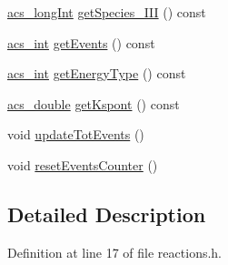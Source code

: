 \begin{DoxyCompactItemize}
\item 
\hyperlink{a00050_a19319d75f02db4308bc5c0026d98cd85}{acs\-\_\-long\-Int} \hyperlink{a00021_aaf426633019113ac4ae54cd5597920be}{get\-Species\-\_\-\-I\-I\-I} () const 
\item 
\hyperlink{a00050_a8d277355641a098190360234e2ebde35}{acs\-\_\-int} \hyperlink{a00021_a4fd82a3f1a6474e53709c2a8c04b793c}{get\-Events} () const 
\item 
\hyperlink{a00050_a8d277355641a098190360234e2ebde35}{acs\-\_\-int} \hyperlink{a00021_ae6fce196577644283fdab4a78909d891}{get\-Energy\-Type} () const 
\item 
\hyperlink{a00050_ab776853a005fcbf56af0424a2a4dd607}{acs\-\_\-double} \hyperlink{a00021_a3cac13cba00c709df26485bbeffda4f0}{get\-Kspont} () const 
\item 
void \hyperlink{a00021_ae7a0bcb1c921c25ad5dc637d664f2c94}{update\-Tot\-Events} ()
\item 
void \hyperlink{a00021_a614a367a15dda1df4160bcdc170a9b32}{reset\-Events\-Counter} ()
\end{DoxyCompactItemize}


\subsection{Detailed Description}


Definition at line 17 of file reactions.\-h.




